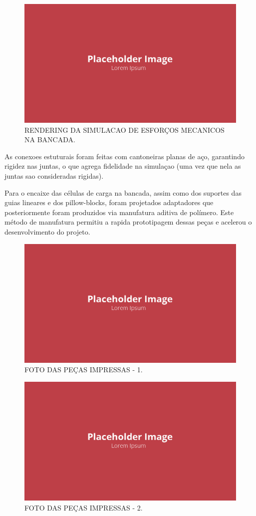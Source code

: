 \begin{figure}[!ht]
    \centering
    \includegraphics[width=.8\linewidth]{figuras/placeholder.png}
    \caption{RENDERING DA SIMULACAO DE ESFORÇOS MECANICOS NA BANCADA\cite{autor}.}
    \label{fig:placeholder}
\end{figure}

As conexoes estuturais foram feitas com cantoneiras planas de aço, garantindo rigidez nas juntas, o que agrega fidelidade na simulaçao (uma vez que nela as juntas sao consideradas rigidas).

Para o encaixe das células de carga na bancada, assim como dos suportes das guias lineares e dos pillow-blocks, foram projetados adaptadores que posteriormente foram produzidos via manufatura aditiva de polímero. Este método de manufatura permitiu a rapida prototipagem dessas peças e acelerou o desenvolvimento do projeto.

\begin{figure}[!ht]
    \centering
    \includegraphics[width=.8\linewidth]{figuras/placeholder.png}
    \caption{FOTO DAS PEÇAS IMPRESSAS - 1\cite{autor}.}
    \label{fig:placeholder}
\end{figure}

\begin{figure}[!ht]
    \centering
    \includegraphics[width=.8\linewidth]{figuras/placeholder.png}
    \caption{FOTO DAS PEÇAS IMPRESSAS - 2\cite{autor}.}
    \label{fig:placeholder}
\end{figure}

